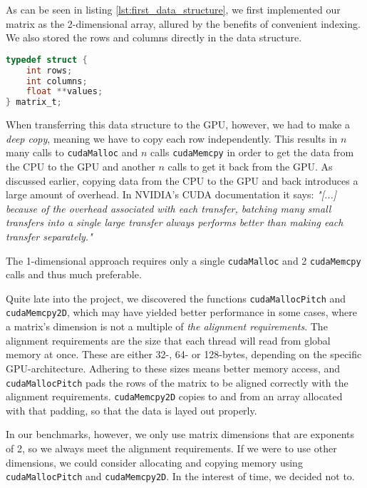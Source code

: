 \noindent As can be seen in listing \ref{lst:first_data_structure}, we first implemented our matrix as the 2-dimensional array, allured by the benefits of convenient indexing. We also stored the rows and columns directly in the data structure.

\begin{lstlisting}[language=C, caption={First implementation of the matrix data structure.}, label={lst:first_data_structure}]
typedef struct {
    int rows;
    int columns;
    float **values;
} matrix_t;
\end{lstlisting}

\noindent When transferring this data structure to the GPU, however, we had to make a \textit{deep copy}\cite{nvidia:deepcopy}, meaning we have to copy each row independently. This results in \(n\) many calls to \texttt{cudaMalloc} and \(n\) calls \texttt{cudaMemcpy} in order to get the data from the CPU to the GPU and another \(n\) calls to get it back from the GPU. As discussed earlier, copying data from the CPU to the GPU and back introduces a large amount of overhead. In NVIDIA's CUDA documentation it says: \textit{"[...] because of the overhead associated with each transfer, batching many small transfers into a single large transfer always performs better than making each transfer separately."}\cite[Sect. 5.3.1]{nvidia:cudadoc}

The 1-dimensional approach requires only a single \texttt{cudaMalloc} and 2 \texttt{cudaMemcpy} calls and thus much preferable.

Quite late into the project, we discovered the functions \texttt{cudaMallocPitch} and \texttt{cudaMemcpy2D}, which may have yielded better performance in some cases, where a matrix's dimension is not a multiple of \textit{the alignment requirements}. The alignment requirements are the size that each thread will read from global memory at once. These are either 32-, 64- or 128-bytes, depending on the specific GPU-architecture.\cite[Sect. 5.3.2.]{nvidia:cudadoc} Adhering to these sizes means better memory access, and \texttt{cudaMallocPitch} pads the rows of the matrix to be aligned correctly with the alignment requirements. \texttt{cudaMemcpy2D} copies to and from an array allocated with that padding, so that the data is layed out properly.

In our benchmarks, however, we only use matrix dimensions that are exponents of 2, so we always meet the alignment requirements. If we were to use other dimensions, we could consider allocating and copying memory using \texttt{cudaMallocPitch} and \texttt{cudaMemcpy2D}. In the interest of time, we decided not to.\\

